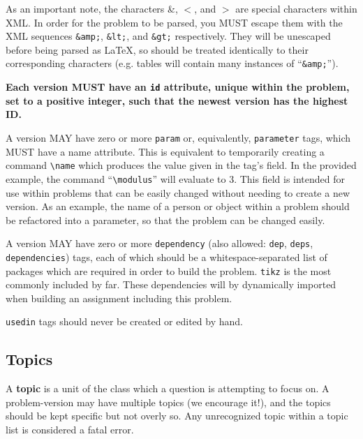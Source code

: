 {    As an important note, the characters \&, $<$, and $>$ are special characters within XML. In order for the problem to be parsed, you MUST escape them with the XML sequences \texttt{\&amp;}, \texttt{\&lt;}, and \texttt{\&gt;} respectively. They will be unescaped before being parsed as \LaTeX, so should be treated identically to their corresponding characters (e.g. tables will contain many instances of ``\texttt{\&amp;}'').
    
    \textbf{Each version MUST have an \texttt{id} attribute, unique within the problem, set to a positive integer, such that the newest version has the highest ID.}
    
    A version MAY have zero or more \texttt{param} or, equivalently, \texttt{parameter} tags, which MUST have a name attribute. This is equivalent to temporarily creating a command \texttt{\textbackslash name} which produces the value given in the tag's field. In the provided example, the command ``\texttt{\textbackslash modulus}'' will evaluate to 3. This field is intended for use within problems that can be easily changed without needing to create a new version. As an example, the name of a person or object within a problem should be refactored into a parameter, so that the problem can be changed easily.
    
    A version MAY have zero or more \texttt{dependency} (also allowed: \texttt{dep}, \texttt{deps}, \texttt{dependencies}) tags, each of which should be a whitespace-separated list of packages which are required in order to build the problem. \texttt{tikz} is the most commonly included by far. These dependencies will by dynamically imported when building an assignment including this problem.
    
    \texttt{usedin} tags should never be created or edited by hand.
  
  \subsection{Topics}
    A \textbf{topic} is a unit of the class which a question is attempting to focus on. A problem-version may have multiple topics (we encourage it!), and the topics should be kept specific but not overly so. Any unrecognized topic within a topic list is considered a fatal error.
    
}
